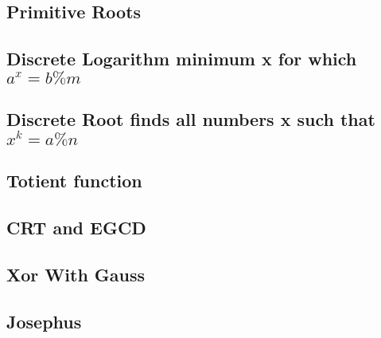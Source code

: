 \subsection{Primitive Roots}
\vspace{-2.2ex}
\raggedbottom
\vspace{-3.2ex}
\hrulefill
\subsection{Discrete Logarithm minimum x for which ${a^x = b \% m}$}
\vspace{-2.2ex}
\raggedbottom
\vspace{-3.2ex}
\hrulefill
\subsection{Discrete Root finds all numbers x such that ${x^k = a \% n}$}
\vspace{-2.2ex}
\raggedbottom
\vspace{-3.2ex}
\hrulefill
\subsection{Totient function}
\vspace{-2.2ex}
\raggedbottom
\vspace{-3.2ex}
\hrulefill
\subsection{CRT and EGCD}
\vspace{-2.2ex}
\raggedbottom
\vspace{-3.2ex}
\hrulefill
\subsection{Xor With Gauss}
\vspace{-2.2ex}
\raggedbottom
\vspace{-3.2ex}
\hrulefill
\subsection{Josephus}
\vspace{-2.2ex}
\raggedbottom
\vspace{-3.2ex}
\hrulefill

